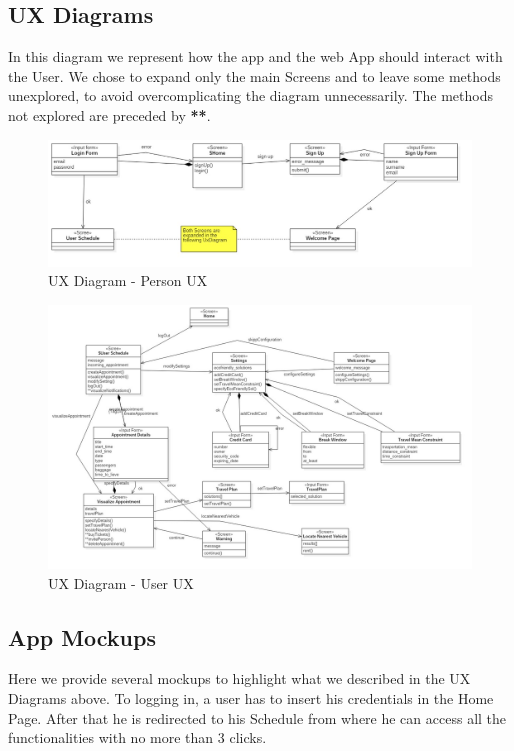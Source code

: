 \subsection{UX Diagrams}
In this diagram we represent how the app and the web App should interact with the User. We chose to expand only the main Screens and to leave some methods unexplored, to avoid overcomplicating the diagram unnecessarily. The methods not explored are preceded by \textbf{**}.

	\begin{figure}[H]	
		\centerline{\includegraphics[width=0.9\paperwidth]{Images/UxPerson}}
		\caption{UX Diagram - Person UX}
	\end{figure}	
	\begin{figure}[H]	
		\centerline{\includegraphics[width=0.9\paperwidth]{Images/UxUser}}
		\caption{UX Diagram - User UX}
	\end{figure}

\subsection{App Mockups}
Here we provide several mockups to highlight what we described in the UX Diagrams above. To logging in, a user has to insert his credentials in the Home Page. After that he is redirected to his Schedule from where he can access all the functionalities with no more than 3 clicks.


